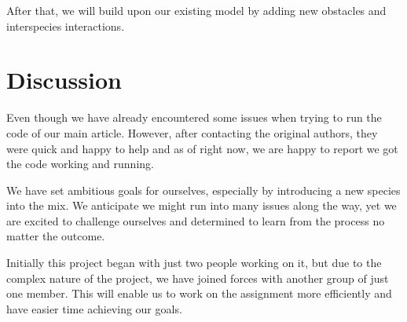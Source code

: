 \documentclass[9pt]{pnas-new}
\begin{document}
After that, we will build upon our existing model by adding new obstacles and interspecies interactions. 

\section*{Discussion}
Even though we have already encountered some issues when trying to run the code of our main article. However, after contacting the original authors, they were quick and happy to help and as of right now, we are happy to report we got the code working and running. 

We have set ambitious goals for ourselves, especially by introducing a new species into the mix. We anticipate we might run into many issues along the way, yet we are excited to challenge ourselves and determined to learn from the process no matter the outcome.

Initially this project began with just two people working on it, but due to the complex nature of the project, we have joined forces with another group of just one member. This will enable us to work on the assignment more efficiently and have easier time achieving our goals.


\showacknow %


\begin{multicols}{2}
\end{multicols}
\end{document}

